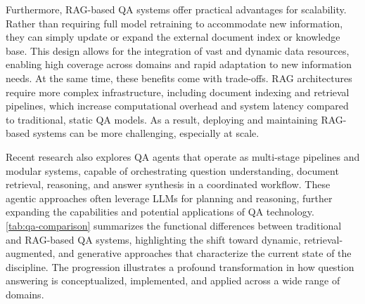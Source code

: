 \begin{spacing}{1.5}
Furthermore, RAG-based QA systems offer practical advantages for scalability. Rather than requiring full model retraining to accommodate new information, they can simply update or expand the external document index or knowledge base. This design allows for the integration of vast and dynamic data resources, enabling high coverage across domains and rapid adaptation to new information needs. At the same time, these benefits come with trade-offs. RAG architectures require more complex infrastructure, including document indexing and retrieval pipelines, which increase computational overhead and system latency compared to traditional, static QA models. As a result, deploying and maintaining RAG-based systems can be more challenging, especially at scale.

Recent research also explores QA agents that operate as multi-stage pipelines and modular systems, capable of orchestrating question understanding, document retrieval, reasoning, and answer synthesis in a coordinated workflow. These agentic approaches often leverage LLMs for planning and reasoning, further expanding the capabilities and potential applications of QA technology.
\\


\autoref{tab:qa-comparison} summarizes the functional differences between traditional and RAG-based QA systems, highlighting the shift toward dynamic, retrieval-augmented, and generative approaches that characterize the current state of the discipline. The progression illustrates a profound transformation in how question answering is conceptualized, implemented, and applied across a wide range of domains.


\end{spacing}
